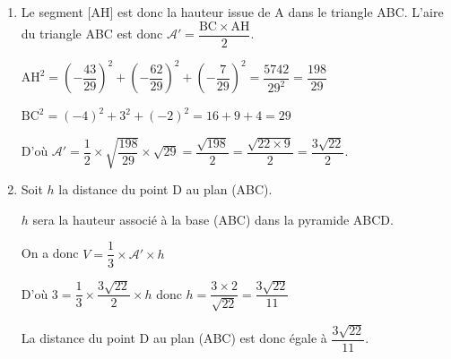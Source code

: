 \begin{enumerate}
\begin{itemize}
On a $\vectt{BC} \begin{pmatrix} -4 \\3 \\ -2 \end{pmatrix}$ et $\vectt{\text{AX}} \begin{pmatrix} -\frac{43}{29} \\ -\frac{62}{29} \\ \frac{-7}{29} \end{pmatrix}$ 

Le repère étant orthonormé on peut calculer le produit scalaire :

$\vectt{\text{AX}} \cdot \vectt{\text{BC}} =  \dfrac{172}{29} - \dfrac{186}{29}+ \dfrac{14}{29} = \dfrac{186}{29} - \dfrac{186}{29} = 0$ donc les vecteurs $\vectt{\text{AX}}$ et $\vectt{\text{BC}}$ sont orthogonaux.

D'autre part $\vectt{\text{BX}} = \begin{pmatrix} -\dfrac{72}{29} \\\dfrac{54}{29}\\ -\dfrac{72}{29} \end{pmatrix}$ et on constate que $\vectt{\text{BX}} = \dfrac{18}{29}\vectt{\text{BC}}$.

Conclusion les vecteurs $\vectt{\text{BX}}$ et $\vectt{\text{BC}}$ sont colinéaires ou encore X appartient à la droite (BC).

X est donc le projeté orthogonal de A sur (BC) ; les coordonnées de H sont bien $\left(\dfrac{73}{29}~;~\dfrac{- 4}{29}~;~\dfrac{21}{29} \right)$.
\end{itemize}

Donc le point H est le projeté orthogonal du point A sur la droite (BC).
	\item Le segment [AH] est donc la hauteur issue de A dans le triangle ABC. 
L'aire du triangle ABC est  donc $\mathcal{A}'= \dfrac{\mathrm{BC} \times \mathrm{AH}}{2}$.

$\mathrm{AH}^2 =  \left(-\dfrac{43}{29} \right)^2 + \left(-\dfrac{62}{29}\right)^2 +  \left(-\dfrac{7}{29}\right) ^2 = \dfrac{5742}{29^2} = \dfrac{198}{29} $ 

$\mathrm{BC}^2= (-4)^2+3^2+(-2)^2= 16+9+4=29$

D'où $\mathcal{A}'= \dfrac{ 1}{2} \times \sqrt{\dfrac{198}{29}} \times  \sqrt{29} = \dfrac{\sqrt{198}}{2}=   \dfrac{\sqrt{22 \times 9 }}{2}=\dfrac{3\sqrt{22}}{2}$.

	\item Soit $h$ la distance du point D au plan (ABC). 

$h$ sera la hauteur associé à la base (ABC) dans la pyramide ABCD. 
	
On a donc $V = \dfrac{1}{3} \times \mathcal{A}' \times h$
	
D'où $3 = \dfrac{1}{3} \times  \dfrac{3\sqrt{22}}{2}\times h $ donc $h = \dfrac{3 \times 2}{\sqrt{22}}= \dfrac{3\sqrt{22}}{11}$

La distance du point D au plan (ABC) est donc égale à $\dfrac{3\sqrt{22}}{11}$.
\end{enumerate}

\medskip
